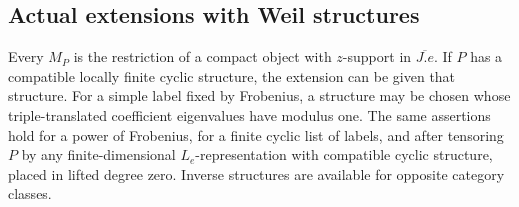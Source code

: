\subsection{Actual extensions with Weil structures}

\begin{proposition}\label{orb:weil-lifts}
Every $M_P$ is the restriction of a compact object with $z$-support in
$\overline{J.e}$.  If $P$ has a compatible locally finite cyclic
structure, the extension can be given that structure.  For a simple
label fixed by Frobenius, a structure may be chosen whose
triple-translated coefficient eigenvalues have modulus one.
The same assertions hold for a power of Frobenius, for a finite cyclic
list of labels, and after tensoring $P$ by any finite-dimensional
$L_e$-representation with compatible cyclic structure, placed in
lifted degree zero.  Inverse structures are available for opposite
category classes.
\end{proposition}

